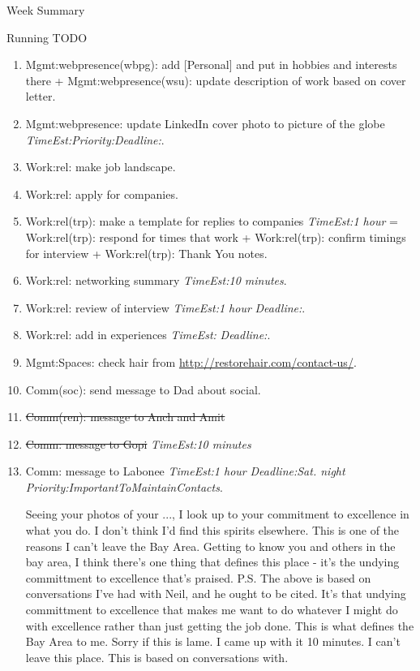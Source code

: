 \documentclass[serif, mathserif, final]{beamer}
\newcommand{\doneTask}[1]{\tiny \item \tiny \sout{#1}}
\newcommand{\te}[1]{\textit{TimeEst:}\textit{#1}}
\newcommand{\dl}[1]{\textit{Deadline:}\textit{#1}}
\newcommand{\pr}[1]{\textit{Priority:}\textit{#1}}
\begin{document}
\begin{frame}
\begin{columns}
\begin{column}{0.5\linewidth}
\begin{block}{Week Summary}
\begin{block}{Running TODO}
\begin{enumerate}
    \item \tiny Mgmt:webpresence(wbpg): add [Personal] and put in hobbies and interests there  + 
      Mgmt:webpresence(wsu): update description of work based on cover
      letter. 

      \item \tiny Mgmt:webpresence: update LinkedIn cover photo to
        picture of the globe \te{}\pr{}\dl{}. 

      \item \tiny Work:rel: make job landscape.  
      \item \tiny Work:rel: apply for companies. 
      \item \tiny Work:rel(trp): make a template for replies to
        companies \te{1 hour} = Work:rel(trp): respond for times that work + 
        Work:rel(trp): confirm timings for interview + Work:rel(trp):
        Thank You notes. 


      \item \tiny Work:rel: networking summary \te{10 minutes}. 
      \item \tiny Work:rel: review of interview \te{1 hour} \dl{}. 
      \item \tiny Work:rel: add in experiences \te{} \dl{}. 
      \item \tiny Mgmt:Spaces: check hair from
        \url{http://restorehair.com/contact-us/}. 

      \item \tiny Comm(soc): send message to Dad about social. 

      \doneTask{ Comm(ren): message to Anch and Amit } 
    \doneTask{Comm: message to Gopi} \te{10 minutes} 
    \item \tiny Comm: message to Labonee \te{1 hour} \dl{Sat. night}
      \pr{ImportantToMaintainContacts}. 
      
      Seeing your photos of your ..., I look up to your commitment to
      excellence in what you do. I don't think I'd find this
      spirits elsewhere. This is one of the reasons I can't leave
      the Bay Area. Getting to know you and others in the bay area, I think
      there's one thing that defines this place - it's the undying
      committment to excellence that's praised. 
      P.S. The above is based on conversations I've had with Neil,
      and he ought to be cited. It's that undying committment to
      excellence that makes me want to do whatever I might do with
      excellence rather than just getting the job done. This is
      what defines the Bay Area to me. Sorry if this is lame. I
      came up with it 10 minutes. I can't leave this place. This
      is based on conversations with. 



\end{enumerate}
\end{block}
\end{block}
\end{column}
\end{columns}
\end{frame}
\end{document}
